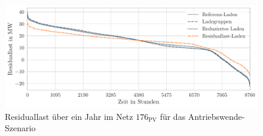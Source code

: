 \begin{figure}[H]
    \centering
    \includegraphics[width=1\textwidth]{Bilder/example_resiual_load}
    \caption[Residuallast über ein Jahr im Netz \num{176} für das Antriebswende-Szenario]{Residuallast über ein Jahr im Netz \(176_{\text{PV}}\) für das Antriebswende-Szenario}\label{fig:residual_load}
\end{figure}